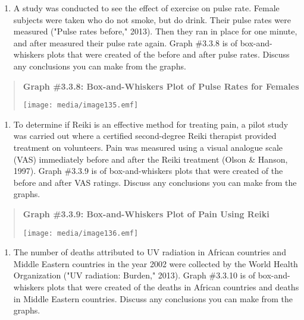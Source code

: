 \documentclass[]{book}
\providecommand{\tightlist}{%
  \setlength{\itemsep}{0pt}\setlength{\parskip}{0pt}}
\begin{document}
\begin{enumerate}
\def\labelenumi{\arabic{enumi}.}
\setcounter{enumi}{9}
\tightlist
\item
  A study was conducted to see the effect of exercise on pulse rate.
  Female subjects were taken who do not smoke, but do drink. Their
  pulse rates were measured ("Pulse rates before," 2013). Then they
  ran in place for one minute, and after measured their pulse rate
  again. Graph \#3.3.8 is of box-and-whiskers plots that were created
  of the before and after pulse rates. Discuss any conclusions you can
  make from the graphs.
\end{enumerate}

\begin{quote}
\textbf{Graph \#3.3.8: Box-and-Whiskers Plot of Pulse Rates for Females}

\texttt{[image: media/image135.emf]}
\end{quote}

\begin{enumerate}
\def\labelenumi{\arabic{enumi}.}
\setcounter{enumi}{10}
\tightlist
\item
  To determine if Reiki is an effective method for treating pain, a
  pilot study was carried out where a certified second-degree Reiki
  therapist provided treatment on volunteers. Pain was measured using
  a visual analogue scale (VAS) immediately before and after the Reiki
  treatment (Olson \& Hanson, 1997). Graph \#3.3.9 is of
  box-and-whiskers plots that were created of the before and after VAS
  ratings. Discuss any conclusions you can make from the graphs.
\end{enumerate}

\begin{quote}
\textbf{Graph \#3.3.9: Box-and-Whiskers Plot of Pain Using Reiki}

\texttt{[image: media/image136.emf]}
\end{quote}

\begin{enumerate}
\def\labelenumi{\arabic{enumi}.}
\setcounter{enumi}{11}
\tightlist
\item
  The number of deaths attributed to UV radiation in African countries
  and Middle Eastern countries in the year 2002 were collected by the
  World Health Organization ("UV radiation: Burden," 2013). Graph
  \#3.3.10 is of box-and-whiskers plots that were created of the
  deaths in African countries and deaths in Middle Eastern countries.
  Discuss any conclusions you can make from the graphs.
\end{enumerate}
\end{document}
